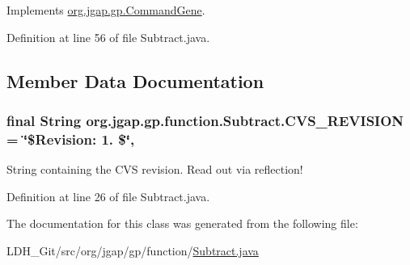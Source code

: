 Implements \hyperlink{classorg_1_1jgap_1_1gp_1_1_command_gene_a236141d99059da808afe7a9217e411c7}{org.\-jgap.\-gp.\-Command\-Gene}.



Definition at line 56 of file Subtract.\-java.



\subsection{Member Data Documentation}
\hypertarget{classorg_1_1jgap_1_1gp_1_1function_1_1_subtract_a82971a09e925f2bb4361f0dfb7104bae}{
\subsubsection[{C\-V\-S\-\_\-\-R\-E\-V\-I\-S\-I\-O\-N}]{\setlength{\rightskip}{0pt plus 5cm}final String org.\-jgap.\-gp.\-function.\-Subtract.\-C\-V\-S\-\_\-\-R\-E\-V\-I\-S\-I\-O\-N = \char`\"{}\$Revision\-: 1. \$\char`\"{}\hspace{0.3cm}{\ttfamily [static]}, {\ttfamily [private]}}}\label{classorg_1_1jgap_1_1gp_1_1function_1_1_subtract_a82971a09e925f2bb4361f0dfb7104bae}
String containing the C\-V\-S revision. Read out via reflection! 

Definition at line 26 of file Subtract.\-java.



The documentation for this class was generated from the following file\-:\begin{DoxyCompactItemize}
\item 
L\-D\-H\-\_\-\-Git/src/org/jgap/gp/function/\hyperlink{_subtract_8java}{Subtract.\-java}\end{DoxyCompactItemize}
